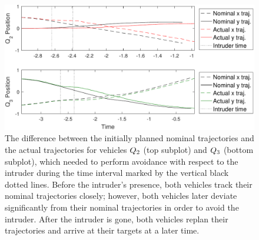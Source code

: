 \begin{figure}[H]
  \centering
  \includegraphics[width=\columnwidth]{"fig/intruder1_diff"}
  \caption{The difference between the initially planned nominal trajectories and the actual trajectories for vehicles $Q_2$ (top subplot) and $Q_3$ (bottom subplot), which needed to perform avoidance with respect to the intruder during the time interval marked by the vertical black dotted lines. Before the intruder's presence, both vehicles track their nominal trajectories closely; however, both vehicles later deviate significantly from their nominal trajectories in order to avoid the intruder. After the intruder is gone, both vehicles replan their trajectories and arrive at their targets at a later time.}
  \label{fig:intruder1_diff}
\end{figure}